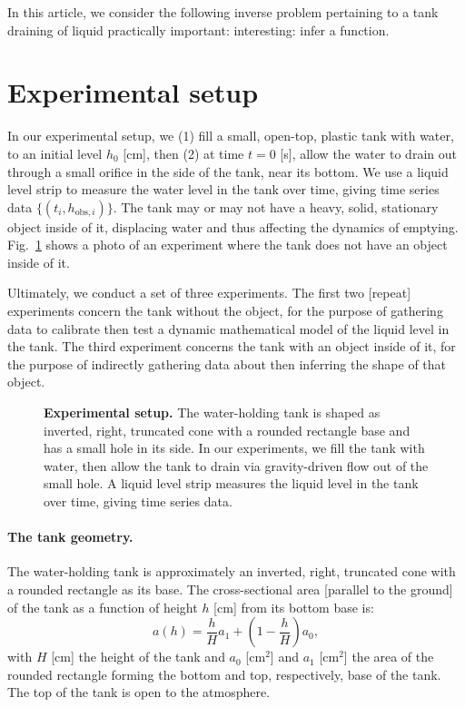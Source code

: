 \documentclass[openacc]{rsproca_new}%
\begin{document}
In this article, we consider the following inverse problem pertaining to a tank draining of liquid
practically important:
interesting: infer a function. 


\section{Experimental setup}
In our experimental setup, we (1) fill a small, open-top, plastic tank with water, to an initial level $h_0$ [cm], then (2) at time $t=0$ [s], allow the water to drain out through a small orifice in the side of the tank, near its bottom. 
We use a liquid level strip to measure the water level in the tank over time, giving time series data $\{(t_i, h_{\text{obs}, i}) \}$. The tank may or may not have a heavy, solid, stationary object inside of it, displacing water and thus affecting the dynamics of emptying. Fig.~\ref{fig:photo_of_tank} shows a photo of an experiment where the tank does not have an object inside of it.

Ultimately, we conduct a set of three experiments. The first two [repeat] experiments concern the tank without the object, for the purpose of gathering data to calibrate then test a dynamic mathematical model of the liquid level in the tank. The third experiment concerns the tank with an object inside of it, for the purpose of indirectly gathering data about then inferring the shape of that object.

\begin{figure}[h!]
\begin{center}
	\caption{\textbf{Experimental setup.} 
	The water-holding tank is shaped as inverted, right, truncated cone with a rounded rectangle base and has a small hole in its side. In our experiments, we fill the tank with water, then allow the tank to drain via gravity-driven flow out of the small hole. A liquid level strip measures the liquid level in the tank over time, giving time series data.
	}
	\label{fig:photo_of_tank}
\end{center}
\end{figure}

\paragraph{The tank geometry.} The water-holding tank is approximately an inverted, right, truncated cone with a rounded rectangle as its base. The cross-sectional area [parallel to the ground] of the tank as a function of height $h$ [cm] from its bottom base is:
\begin{equation}
	a(h) = \frac{h}{H}a_1 + \left(1-\frac{h}{H}\right) a_0,
\end{equation}
with $H$ [cm] the height of the tank and $a_0$ [cm$^2$] and $a_1$ [cm$^2$] the area of the rounded rectangle forming the bottom and top, respectively, base of the tank.
The top of the tank is open to the atmosphere. 
\end{document}
